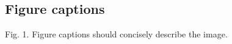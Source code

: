 \documentclass[12pt,letterpaper]{article}
\begin{document}
\begin{flushleft}
	
	
		
	
	

\newpage %
\section*{Figure captions}
Fig. 1. Figure captions should concisely describe the image.


\end{flushleft}
\end{document}

